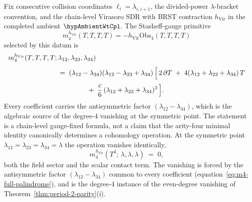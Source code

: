 \begin{proposition}%
\label{prop:gravity-m4}
Fix consecutive collision coordinates
\(\ell_i=\lambda_{i,i+1}\), the divided-power
\(\lambda\)-bracket convention, and the chain-level Virasoro SDR
with BRST contraction \(h_{\mathrm{Vir}}\) in the completed ambient
\(\hypAmbientWtCpl\).  The Stasheff-gauge primitive
\[
m_4^{h_{\mathrm{Vir}}}(T,T,T,T)
=-h_{\mathrm{Vir}}\mathrm{Obs}_4(T,T,T,T)
\]
selected by this datum is
\begin{equation}\label{eq:gravity-m4}
\begin{aligned}
m_4^{h_{\mathrm{Vir}}}(T,T,T,T;\,&\lambda_{12},\lambda_{23},\lambda_{34})
\\[3pt]
&=\;
(\lambda_{12} - \lambda_{34})(\lambda_{12} - \lambda_{23} + \lambda_{34})
\,\Bigl[\,
2\,\partial T
\;+\; 4(\lambda_{12} + \lambda_{23} + \lambda_{34})\,T
\\[3pt]
&\qquad\qquad
\;+\;
\frac{c}{6}\,(\lambda_{12} + \lambda_{23} + \lambda_{34})^3
\,\Bigr].
\end{aligned}
\end{equation}
Every coefficient carries the antisymmetric factor
$(\lambda_{12} - \lambda_{34})$, which is the algebraic source of the
degree-$4$ vanishing at the symmetric point.  The statement is a
chain-level gauge-fixed formula, not a claim that the arity-four
minimal identity canonically determines a cohomology operation.
At the symmetric point $\lambda_{12} = \lambda_{23} = \lambda_{34} = \lambda$
the operation vanishes identically,
\begin{equation}\label{eq:gravity-m4-sym}
m_4^{h_{\mathrm{Vir}}}(T^4;\,\lambda,\lambda,\lambda)
\;=\;
0,
\end{equation}
both the field sector and the scalar contact term. The vanishing
is forced by the antisymmetric factor $(\lambda_{12} - \lambda_{34})$
common to every coefficient
(equation~\eqref{eq:m4-full-palindrome}), and is the degree-$4$
instance of the even-degree vanishing of
Theorem~\ref{thm:period-2-parity}(i).
\end{proposition}

